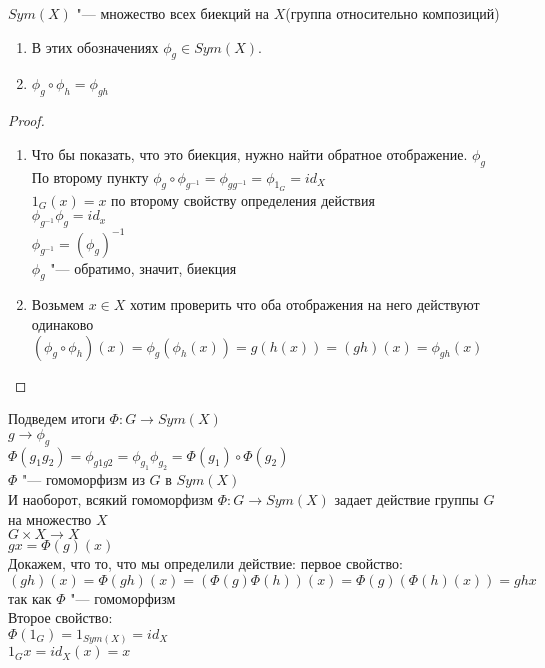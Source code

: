 $Sym(X)$ "--- множество всех биекций на $X$(группа относительно композиций)\\
\begin{lemma}\hfill
\begin{enumerate}
\item
В этих обозначениях $\phi_g \in Sym(X)$.
\item
$\phi_g \circ \phi_h = \phi_{gh}$\\
\end{enumerate}
\end{lemma}
\begin{proof}
\begin{enumerate}
     \item
     Что бы показать, что это биекция, нужно найти обратное отображение. 
     $\phi_g$\\
     По второму пункту
     $\phi_g \circ \phi_{g^{-1}} = \phi_{gg^{-1}} = \phi_{1_G} = id_X$\\
     $1_G(x) = x$ по второму свойству определения действия\\
     $\phi_{g^{-1}}\phi_{g} = id_{x}$ \\
     $\phi_{g^{-1}} = (\phi_g)^{-1}$\\
     $\phi_g$ "--- обратимо, значит, биекция\\
     \item
     Возьмем $x \in X$ хотим проверить что оба отображения на него действуют одинаково\\
     $(\phi_g \circ \phi_h)(x) = \phi_g(\phi_h(x)) = g(h(x)) = (gh)(x) = \phi_{gh}(x)$\\
\end{enumerate}
\end{proof}

Подведем итоги
$\Phi \colon G \to Sym(X)$\\
$g \to \phi_g$\\

$\Phi(g_1g_2) = \phi_{g1g2} = \phi_{g_1}\phi_{g_2} = \Phi(g_1) \circ \Phi(g_2)$\\
$\Phi$ "--- гомоморфизм из $G$ в $Sym(X)$\\

И наоборот, всякий гомоморфизм $\Phi \colon G \to Sym(X)$ задает действие группы $G$ на множество $X$\\
$G \times X \to X$\\
$gx = \Phi(g)(x)$\\


Докажем, что то, что мы определили действие:
первое свойство:\\
$(gh)(x) = \Phi(gh)(x) = (\Phi(g)\Phi(h))(x) = \Phi(g)(\Phi(h)(x)) = ghx$\\
так как $\Phi$ "--- гомоморфизм\\ 
Второе свойство:\\
$\Phi(1_G) = 1_{Sym(X)} = id_X$\\
$1_{G}x = id_X(x) = x$

